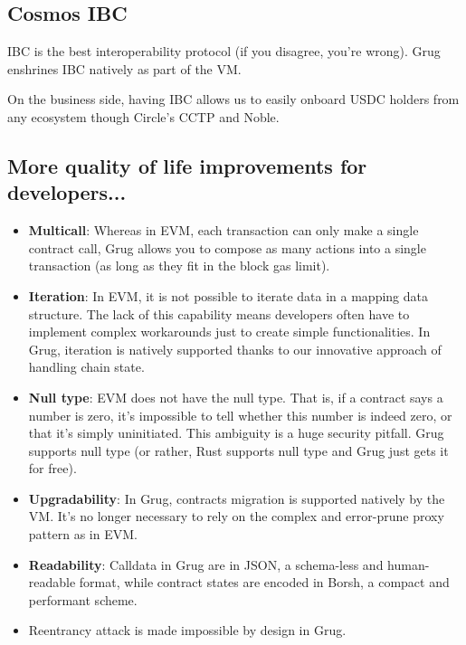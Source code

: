 \documentclass{article}
\begin{document}
\subsection{Cosmos IBC}

IBC\supercite{ibc} is the best interoperability protocol (if you disagree, you're wrong). Grug enshrines IBC natively as part of the VM.

On the business side, having IBC allows us to easily onboard USDC holders from any ecosystem though Circle's CCTP\supercite{cctp} and Noble.\supercite{noble}

\subsection{More quality of life improvements for developers...}

\begin{itemize}
  \item \textbf{Multicall}: Whereas in EVM, each transaction can only make a single contract call, Grug allows you to compose as many actions into a single transaction (as long as they fit in the block gas limit).
  \item \textbf{Iteration}: In EVM, it is not possible to iterate data in a mapping data structure. The lack of this capability means developers often have to implement complex workarounds just to create simple functionalities. In Grug, iteration is natively supported thanks to our innovative approach of handling chain state.\supercite{cosmossdkstorev2}
  \item \textbf{Null type}: EVM does not have the null type. That is, if a contract says a number is zero, it's impossible to tell whether this number is indeed zero, or that it's simply uninitiated. This ambiguity is a huge security pitfall. Grug supports null type (or rather, Rust supports null type and Grug just gets it for free).
  \item \textbf{Upgradability}: In Grug, contracts migration is supported natively by the VM. It's no longer necessary to rely on the complex and error-prune proxy pattern\supercite{openzeppelinproxies} as in EVM.
  \item \textbf{Readability}: Calldata in Grug are in JSON, a schema-less and human-readable format, while contract states are encoded in Borsh,\supercite{borsh} a compact and performant scheme.
  \item Reentrancy attack is made impossible\supercite{cosmwasmreentrancy} by design in Grug.
\end{itemize}
\end{document}
